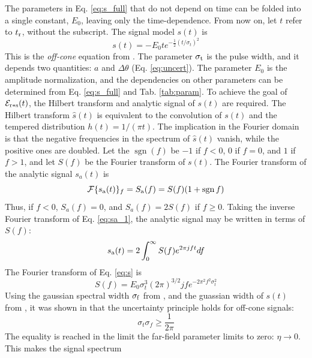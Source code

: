\documentclass[amsmath,amssymb,aps,prd,10pt,twocolumn,showkeys]{revtex4}
\DeclareMathOperator{\sgn}{sgn}
\begin{document}
The parameters in Eq. \ref{eq:s_full} that do not depend on time can be folded into a single constant, $E_0$, leaving only the time-dependence.  From now on, let $t$ refer to $t_{\rm r}$, without the subscript.  The signal model $s(t)$ is
\begin{equation}
s(t) = -E_0 t e^{-\frac{1}{2}\left(t/\sigma_t\right)^2} \label{eq:s}
\end{equation}
This is the \textit{off-cone} equation from \cite{PhysRevD.105.123019}.  The parameter $\sigma_{\rm t}$ is the pulse width, and it depends two quantities: $a$ and $\Delta\theta$ (Eq. \ref{eq:uncert}).  The parameter $E_0$ is the amplitude normalization, and the dependencies on other parameters can be determined from Eq. \ref{eq:s_full} and Tab. \ref{tab:param}.  To achieve the goal of $\mathcal{E}_{\rm r * s}(t)$, the Hilbert transform and analytic signal of $s(t)$ are required.  The Hilbert transform $\widehat{s}(t)$ is equivalent to the convolution of $s(t)$ and the tempered distribution $h(t) = 1/(\pi t)$.  The implication in the Fourier domain is that the negative frequencies in the spectrum of $\hat{s}(t)$ vanish, while the positive ones are doubled.  Let the $\sgn(f)$ be $-1$ if $f<0$, $0$ if $f=0$, and $1$ if $f>1$, and let $S(f)$ be the Fourier transform of $s(t)$.  The Fourier transform of the analytic signal $s_a(t)$ is
\begin{equation}
\mathcal{F}\lbrace s_{\rm a}(t) \rbrace_{f} = S_{\rm a}(f) = S(f)(1+\sgn{f}) \label{eq:sa_1}
\end{equation}
Thus, if $f<0$, $S_a(f) = 0$, and $S_a(f) = 2S(f)$ if $f\geq 0$.  Taking the inverse Fourier transform of Eq. \ref{eq:sa_1}, the analytic signal may be written in terms of $S(f)$:
\begin{equation}
s_{\rm a}(t) = 2\int_{0}^{\infty} S(f) e^{2\pi j f t} df \label{eq:sa_2}
\end{equation}
 The Fourier transform of Eq. \ref{eq:s} is
\begin{equation}
S(f) = E_0 \sigma_t^3 (2\pi)^{3/2} j f e^{-2\pi^2 f^2 \sigma_t^2}
\end{equation}
Using the gaussian spectral width $\sigma_{\rm f}$ from \cite{10.1016/j.astropartphys.2017.03.008}, and the guassian width of $s(t)$ from \cite{PhysRevD.105.123019}, it was shown in \cite{PhysRevD.105.123019} that the uncertainty principle holds for off-cone signals:
\begin{equation}
\sigma_t \sigma_f \geq \frac{1}{2\pi}
\end{equation}
The equality is reached in the limit the far-field parameter limits to zero: $\eta \to 0$.  This makes the signal spectrum
\end{document}
